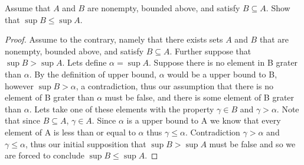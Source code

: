\documentclass[12pt]{article}
\makeatletter
\theoremstyle{homework}
\newenvironment{exercise}[1]
{\def\@currentlabel{#1}\exercisecore}
{\endexercisecore}
\makeatother
\begin{document}
\begin{exercise}{1.3.4}
Assume that $A$ and $B$ are nonempty, bounded above, and satisfy $B\subseteq A$.
Show that $\sup B \le \sup A$.
\end{exercise}
\begin{proof}
Assume to the contrary, namely that there exists sets $A$ and $B$ that are nonempty, bounded above, and satisfy $B\subseteq A$.  Further suppose that $\sup B > \sup A$.  Lets define $\alpha=\sup A$.  Suppose there is no element in B grater than $\alpha$.  By the definition of upper bound, $\alpha$ would be a upper bound to B, however $\sup B>\alpha$, a contradiction, thus our assumption that there is no element of B grater than $\alpha$ must be false, and there is some element of B grater than $\alpha$.  Lets take one of these elements with the property $\gamma \in B$ and $\gamma > \alpha$.  Note that since $B\subseteq A$, $\gamma \in A$.  Since $\alpha$ is a upper bound to A we know that every element of A is less than or equal to $\alpha$ thus $\gamma \leq \alpha$.  Contradiction $\gamma > \alpha$ and $\gamma \leq \alpha$, thus our initial supposition that $\sup B > \sup A$ must be false and so we are forced to conclude $\sup B \le \sup A$.
\end{proof}
\end{document}

